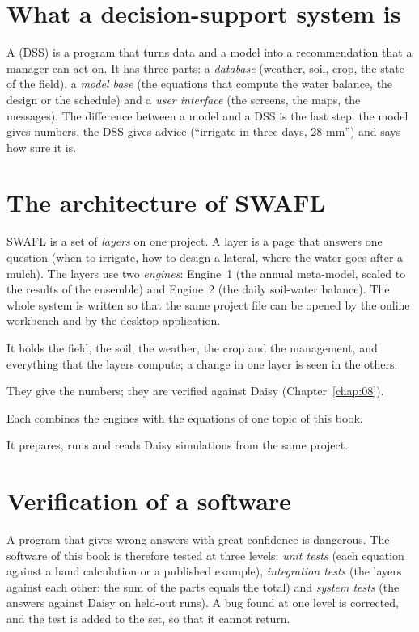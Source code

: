 \section{What a decision-support system is}
A  (DSS) is a program that turns data and a model into a recommendation that a manager can act on. It has three parts: a \emph{database} (weather, soil, crop, the state of the field), a \emph{model base} (the equations that compute the water balance, the design or the schedule) and a \emph{user interface} (the screens, the maps, the messages). The difference between a model and a DSS is the last step: the model gives numbers, the DSS gives advice (``irrigate in three days, 28 mm'') and says how sure it is.

\section{The architecture of SWAFL}
SWAFL is a set of \emph{layers} on one project. A layer is a page that answers one question (when to irrigate, how to design a lateral, where the water goes after a mulch). The layers use two \emph{engines}: Engine~1 (the annual meta-model, scaled to the results of the ensemble) and Engine~2 (the daily soil-water balance). The whole system is written so that the same project file can be opened by the online workbench and by the desktop application.
\begin{exlist}
\item {} It holds the field, the soil, the weather, the crop and the management, and everything that the layers compute; a change in one layer is seen in the others.
\item {} They give the numbers; they are verified against Daisy (Chapter~\ref{chap:08}).
\item {} Each combines the engines with the equations of one topic of this book.
\item {} It prepares, runs and reads Daisy simulations from the same project.
\end{exlist}

\section{Verification of a software}
A program that gives wrong answers with great confidence is dangerous. The software of this book is therefore tested at three levels: \emph{unit tests} (each equation against a hand calculation or a published example), \emph{integration tests} (the layers against each other: the sum of the parts equals the total) and \emph{system tests} (the answers against Daisy on held-out runs). A bug found at one level is corrected, and the test is added to the set, so that it cannot return.

